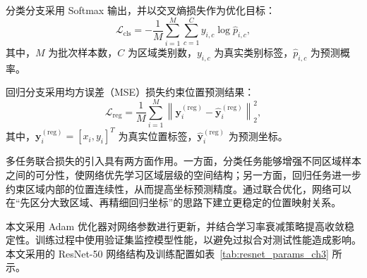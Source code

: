 分类分支采用 Softmax 输出，并以交叉熵损失作为优化目标：
\begin{equation}
\mathcal{L}_{\mathrm{cls}}=-\frac{1}{M}\sum_{i=1}^{M}\sum_{c=1}^{C}y_{i,c}\log \hat{p}_{i,c},
\label{eq:cls_loss_ch3}
\end{equation}
其中，\(M\) 为批次样本数，\(C\) 为区域类别数，\(y_{i,c}\) 为真实类别标签，\(\hat{p}_{i,c}\) 为预测概率。

回归分支采用均方误差（MSE）损失约束位置预测结果：
\begin{equation}
\mathcal{L}_{\mathrm{reg}}=\frac{1}{M}\sum_{i=1}^{M}\left\|\mathbf{y}^{(\mathrm{reg})}_i-\hat{\mathbf{y}}^{(\mathrm{reg})}_i\right\|_2^2,
\label{eq:reg_loss_ch3}
\end{equation}
其中，\(\mathbf{y}^{(\mathrm{reg})}_i=[x_i,y_i]^T\) 为真实位置标签，\(\hat{\mathbf{y}}^{(\mathrm{reg})}_i\) 为预测坐标。

多任务联合损失的引入具有两方面作用。一方面，分类任务能够增强不同区域样本之间的可分性，使网络优先学习区域层级的空间结构；另一方面，回归任务进一步约束区域内部的位置连续性，从而提高坐标预测精度。通过联合优化，网络可以在“先区分大致区域、再精细回归坐标”的思路下建立更稳定的位置映射关系。

本文采用 Adam 优化器对网络参数进行更新，并结合学习率衰减策略提高收敛稳定性。训练过程中使用验证集监控模型性能，以避免过拟合对测试性能造成影响。本文采用的 ResNet-50 网络结构及训练配置如表~\ref{tab:resnet_params_ch3} 所示。


